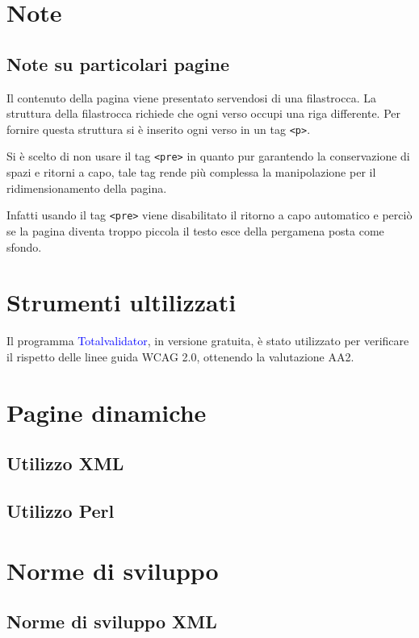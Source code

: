 \documentclass[10pt,a4paper,onecolumn]{article}
\newcommand{\progname}[1]{\textcolor{blue}{\textsf{#1}}}
\begin{document}
\section{Note}
\subsection{Note su particolari pagine}
Il contenuto della pagina viene presentato servendosi di una filastrocca. La struttura della filastrocca richiede che ogni verso occupi una riga differente. Per fornire questa struttura si è inserito ogni verso in un tag \texttt{<p>}.

Si è scelto di non usare il tag \texttt{<pre>} in quanto pur garantendo la conservazione di spazi e ritorni a capo, tale tag rende più complessa la manipolazione per il ridimensionamento della pagina.

Infatti usando il tag \texttt{<pre>} viene disabilitato il ritorno a capo automatico e perciò se la pagina diventa troppo piccola il testo esce della pergamena posta come sfondo.

\section{Strumenti ultilizzati}

Il programma \progname{Totalvalidator}, in versione gratuita, è stato utilizzato per verificare il rispetto delle linee guida WCAG 2.0, ottenendo la valutazione AA2.

\section{Pagine dinamiche}

\subsection{Utilizzo XML}

\subsection{Utilizzo Perl}

\clearpage

\section{Norme di sviluppo}

\subsection{Norme di sviluppo XML}
\end{document}
